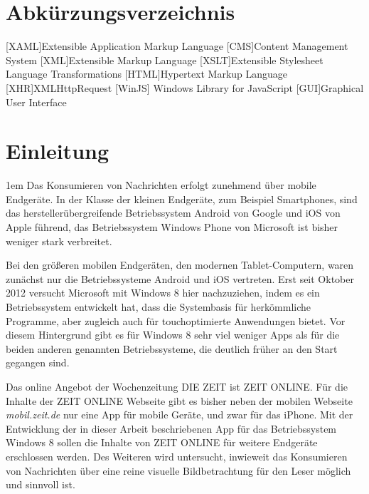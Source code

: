 \documentclass[12pt,a4paper,bibtotoc,abstracton]{scrartcl}
\begin{document}
\newpage
\tableofcontents

\newpage
\thispagestyle{plain}
\listoffigures

\vspace{2cm}
\listoftables

\newpage
\thispagestyle{plain}
\renewcommand\lstlistlistingname{Listingsverzeichnis}
\lstlistoflistings
\vspace{2cm}
\section*{Abkürzungsverzeichnis}
\label{sec:abkürzungen}
\begin{acronym}[SEPSEP]
	[XAML]{Extensible Application Markup Language}
	 [CMS]{Content Management System}
	 [XML]{Extensible Markup Language}
	[XSLT]{Extensible Stylesheet Language Transformations}
	[HTML]{Hypertext Markup Language}
	[XHR]{XMLHttpRequest}
	[WinJS] {Windows Library for JavaScript}
	[GUI]{Graphical User Interface}
\end{acronym}

\pagestyle{headings}


\newpage
{}
\setcounter{page}{1}
\section{Einleitung}
\label{sec:einleitung}
\parindent1em
Das Konsumieren von Nachrichten erfolgt zunehmend über mobile Endgeräte. 
In der Klasse der kleinen Endgeräte, zum Beispiel Smartphones, sind das herstellerübergreifende  Betriebssystem Android von Google und iOS von Apple führend, das Betriebssystem Windows Phone von Microsoft ist bisher weniger stark verbreitet.

Bei den größeren mobilen Endgeräten, den modernen Tablet-Computern, waren zunächst nur die Betriebssysteme Android und iOS vertreten. Erst seit Oktober 2012 versucht Microsoft mit Windows 8 hier nachzuziehen, indem es ein Betriebssystem entwickelt hat, dass die Systembasis für herkömmliche Programme, aber zugleich auch für touchoptimierte Anwendungen bietet. Vor diesem Hintergrund gibt es für Windows 8 sehr viel weniger Apps als für die beiden anderen genannten Betriebssysteme, die deutlich früher an den Start gegangen sind.

Das online Angebot der Wochenzeitung DIE ZEIT ist ZEIT ONLINE. 
Für die Inhalte der ZEIT ONLINE Webseite gibt es bisher neben der mobilen Webseite \textit{mobil.zeit.de} nur eine App für mobile Geräte, und zwar für das iPhone. Mit der Entwicklung der in dieser Arbeit beschriebenen App für das Betriebssystem Windows 8 sollen die Inhalte von ZEIT ONLINE für weitere Endgeräte erschlossen werden. Des Weiteren wird untersucht, inwieweit das Konsumieren von Nachrichten über eine reine visuelle  Bildbetrachtung für den Leser möglich und sinnvoll ist. 
\end{document}
